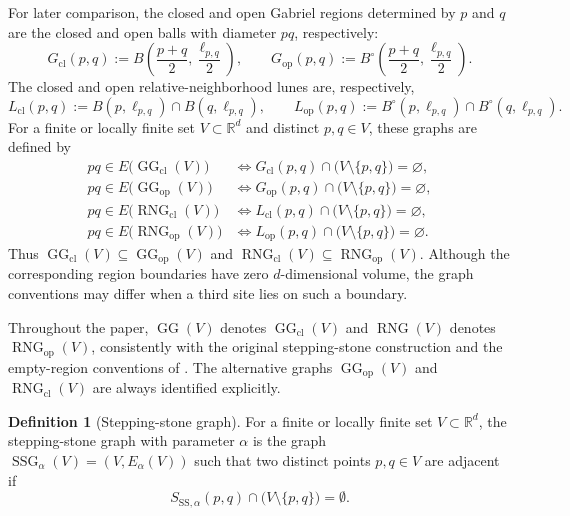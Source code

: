 \documentclass[a4paper,fleqn]{cas-sc}
\theoremstyle{definition}
\newtheorem{definition}{Definition}
\theoremstyle{remark}
\newcommand{\R}{\mathds{R}}
\newcommand{\ellpq}{\ell_{p,q}}
\newcommand{\0}{\mathbf{0}}
\newcommand{\tv}[1]{#1}
\newcommand{\tv}[1]{\textcolor[HTML]{6A1B9A}{#1}}
\DeclareMathOperator{\SSG}{SSG}
\DeclareMathOperator{\RNG}{RNG}
\DeclareMathOperator{\GG}{GG}
\begin{document}
\tv{For later comparison, the closed and open Gabriel regions determined by
$p$ and $q$ are the closed and open balls with diameter $pq$, respectively:}
\begin{equation}
    \tv{
    G_{\mathrm{cl}}(p,q)
    :=B\!\left(\frac{p+q}{2},\frac{\ellpq}{2}\right),
    \qquad
    G_{\mathrm{op}}(p,q)
    :=B^\circ\!\left(\frac{p+q}{2},\frac{\ellpq}{2}\right).
    }
\end{equation}
\tv{The closed and open relative-neighborhood lunes are, respectively,}
\begin{equation}
    L_{\mathrm{cl}}(p,q)
    :=B(p,\ellpq)\cap B(q,\ellpq),
    \qquad
    L_{\mathrm{op}}(p,q)
    :=B^\circ(p,\ellpq)\cap B^\circ(q,\ellpq).
\end{equation}
For a finite or locally finite set $V\subset\R^d$ and distinct $p,q\in V$,
these graphs are defined by
\begin{equation}
\begin{aligned}
pq\in E\bigl(\GG_{\mathrm{cl}}(V)\bigr)
&\iff
G_{\mathrm{cl}}(p,q)\cap\bigl(V\setminus\{p,q\}\bigr)=\varnothing,\\
pq\in E\bigl(\GG_{\mathrm{op}}(V)\bigr)
&\iff
G_{\mathrm{op}}(p,q)\cap\bigl(V\setminus\{p,q\}\bigr)=\varnothing,\\
pq\in E\bigl(\RNG_{\mathrm{cl}}(V)\bigr)
&\iff
L_{\mathrm{cl}}(p,q)\cap\bigl(V\setminus\{p,q\}\bigr)=\varnothing,\\
pq\in E\bigl(\RNG_{\mathrm{op}}(V)\bigr)
&\iff
L_{\mathrm{op}}(p,q)\cap\bigl(V\setminus\{p,q\}\bigr)=\varnothing.
\end{aligned}
\end{equation}
\tv{Thus $\GG_{\mathrm{cl}}(V)\subseteq\GG_{\mathrm{op}}(V)$ and
$\RNG_{\mathrm{cl}}(V)\subseteq\RNG_{\mathrm{op}}(V)$. Although the
corresponding region boundaries have zero $d$-dimensional volume, the graph
conventions may differ when a third site lies on such a boundary.}

\tv{Throughout the paper, $\GG(V)$ denotes $\GG_{\mathrm{cl}}(V)$ and
$\RNG(V)$ denotes $\RNG_{\mathrm{op}}(V)$, consistently with the original
stepping-stone construction and the empty-region conventions of
\citet{kannangara2018stepping,cardinal2009empty}. The alternative graphs
$\GG_{\mathrm{op}}(V)$ and $\RNG_{\mathrm{cl}}(V)$ are always identified
explicitly.}

\begin{definition}[Stepping-stone graph]
For a finite or locally finite set $V\subset\R^d$, the stepping-stone
graph with parameter $\alpha$ is the graph
\tv{$\SSG_\alpha(V)=(V,E_\alpha(V))$} such that two distinct points
$p,q\in V$ are adjacent if
\begin{equation}
    S_{\mathrm{SS},\alpha}(p,q)
    \cap
    \bigl(V\setminus\{p,q\}\bigr)
    =
    \emptyset.
\end{equation}
\end{definition}
\end{document}
